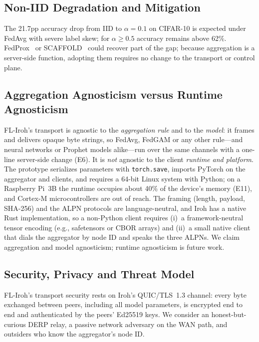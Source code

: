 \documentclass[a4paper,fleqn]{cas-dc}
\begin{document}
\subsection{Non-IID Degradation and Mitigation}

The 21.7pp accuracy drop from IID to $\alpha{=}0.1$ on CIFAR-10 is expected under FedAvg with severe label skew; for $\alpha{\geq}0.5$ accuracy remains above 62\%. FedProx~\cite{fedprox2020} or SCAFFOLD~\cite{scaffold2020} could recover part of the gap; because aggregation is a server-side function, adopting them requires no change to the transport or control plane.

\subsection{Aggregation Agnosticism versus Runtime Agnosticism}
\label{sec:agnostic}

FL-Iroh's transport is agnostic to the \emph{aggregation rule} and to the \emph{model}: it frames and delivers opaque byte strings, so FedAvg, FedGAM or any other rule---and neural networks or Prophet models alike---run over the same channels with a one-line server-side change (E6). It is \emph{not} agnostic to the client \emph{runtime and platform}. The prototype serializes parameters with \texttt{torch.save}, imports PyTorch on the aggregator and clients, and requires a 64-bit Linux system with Python; on a Raspberry Pi~3B the runtime occupies about 40\% of the device's memory (E11), and Cortex-M microcontrollers are out of reach. The framing (length, payload, SHA-256) and the ALPN protocols are language-neutral, and Iroh has a native Rust implementation, so a non-Python client requires (i)~a framework-neutral tensor encoding (e.g., safetensors or CBOR arrays) and (ii)~a small native client that dials the aggregator by node ID and speaks the three ALPNs. We claim aggregation and model agnosticism; runtime agnosticism is future work.

\subsection{Security, Privacy and Threat Model}
\label{sec:threat}

FL-Iroh's transport security rests on Iroh's QUIC/TLS~1.3 channel: every byte exchanged between peers, including all model parameters, is encrypted end to end and authenticated by the peers' Ed25519 keys. We consider an honest-but-curious DERP relay, a passive network adversary on the WAN path, and outsiders who know the aggregator's node ID.
\end{document}
